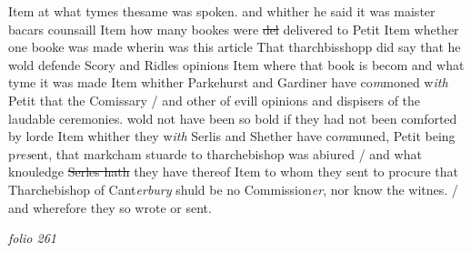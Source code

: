 \documentclass[12pt, a4paper]{book}
\begin{document}
               \textit{} 
				\marginpar[\vspace{0.5cm}{\textcolor{Gray}{20}}]{}
			 Item at what tymes thesame was spoken. and whither he said  it was maister bacars counsaill 
				\marginpar[\vspace{0.5cm}{\textcolor{Gray}{21}}]{}
			 Item how many bookes were \sout{del }delivered to Petit 
				\marginpar[\vspace{0.5cm}{\textcolor{Gray}{22}}]{}
			 Item whether one booke was made wherin was this article That tharchbisshopp did say that he wold defende Scory and Ridles opinions 
				\marginpar[\vspace{0.5cm}{\textcolor{Gray}{23}}]{}
			 Item where that book is becom and what tyme it was made 
				\marginpar[\vspace{0.5cm}{\textcolor{Gray}{24}}]{}
			 Item whither Parkehurst and Gardiner have co\textit{m}moned w\textit{ith} Petit that the Comissary / and other of evill opinions and dispisers of the laudable ceremonies. wold not have been so bold if they had not been comforted by lorde 
				\marginpar[\vspace{0.5cm}{\textcolor{Gray}{25}}]{}
			 Item whither they w\textit{ith} Serlis and Shether have co\textit{m}muned, Petit  being p\textit{res}ent, that markcham stuarde to tharchebishop was  abiured / and what knouledge \sout{Serles hath}
               they have
			 thereof 
				\marginpar[\vspace{0.5cm}{\textcolor{Gray}{26}}]{}
			 Item to whom they sent to procure that Tharchebishop of Cant\textit{erbury} shuld be no Commission\textit{er}, nor know the witnes. / and wherefore they so wrote or sent.

\dotfill
					

\textit{folio 261}
\end{document}
